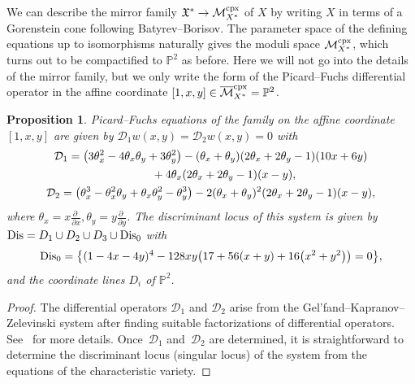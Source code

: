 \documentclass[pdftex]{sigma}
\numberwithin{equation}{section}
\newtheorem{Proposition}[Theorem]{Proposition}
\begin{document}
We can describe the mirror family $\mathfrak{X}^{*}\to\mathcal{M}_{X^{*}}^{\rm cpx}$ of $X$ by writing $X$ in terms of a Gorenstein cone following Batyrev--Borisov. The parameter space of the defining equations up to isomorphisms naturally gives the moduli space $\mathcal{M}_{X^{*}}^{\rm cpx}$, which turns out to be compactified to $\mathbb{P}^{2}$ as before. Here we will not go into the details of the mirror family, but we only write the form of the Picard--Fuchs differential operator in the affine coordinate $[1,x,y]\in\overline{\mathcal{M}}_{X^{*}}^{\rm cpx}=\mathbb{P}^{2}$.
\begin{Proposition} Picard--Fuchs equations of the family on the affine coordinate $[1,x,y]$ are given by $\mathcal{D}_{1}w(x,y)=\mathcal{D}_{2}w(x,y)=0$ with
\begin{gather*}
\mathcal{D}_{1}= \big(3\theta_{x}^{2}-4\theta_{x}\theta_{y}+3\theta_{y}^{2}\big)-(\theta_{x}+\theta_{y})(2\theta_{x}+2\theta_{y}-1)(10x+6y)\\
\hphantom{\mathcal{D}_{1}=}{} +4\theta_{x}(2\theta_{x}+2\theta_{y}-1)(x-y),\\
\mathcal{D}_{2}= \big(\theta_{x}^{3}-\theta_{x}^{2}\theta_{y}+\theta_{x}\theta_{y}^{2}-\theta_{y}^{3}\big)-2(\theta_{x}+\theta_{y})^{2}(2\theta_{x}+2\theta_{y}-1)(x-y),
\end{gather*}
where $\theta_{x}=x\frac{\partial\;}{\partial x},\theta_{y}=y\frac{\partial\;}{\partial y}$. The discriminant locus of this system is given by ${\rm Dis}=D_{1}\cup D_{2}\cup D_{3}\cup {\rm Dis}_{0}$ with
\begin{gather*}
{\rm Dis}_{0}=\big\{ (1-4x-4y)^{4}-128xy\big(17+56(x+y)+16\big(x^{2}+y^{2}\big)\big)=0\big\} ,%
\end{gather*}
and the coordinate lines $D_{i}$ of $\mathbb{P}^{2}$. \end{Proposition}
\begin{proof}The differential operators $\mathcal{D}_{1}$ and $\mathcal{D}_{2}$ arise from the Gel'fand--Kapranov--Zelevinski system after finding suitable factorizations of differential operators. See~\cite{HKTY} for more details. Once~$\mathcal{D}_{1}$ and~$\mathcal{D}_{2}$ are determined,
it is straightforward to determine the discriminant locus (singular locus) of the system from the equations of the characteristic variety.
\end{proof}
\end{document}
